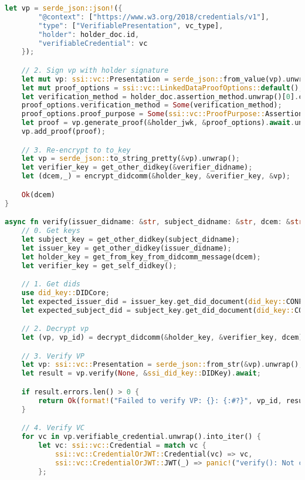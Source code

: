 \begin{lstlisting}[language=Rust]
    let vp = serde_json::json!({
        "@context": ["https://www.w3.org/2018/credentials/v1"],
        "type": ["VerifiablePresentation", vc_type],
        "holder": holder_doc.id,
        "verifiableCredential": vc
    });

    // 2. Sign vp with holder signature
    let mut vp: ssi::vc::Presentation = serde_json::from_value(vp).unwrap();
    let mut proof_options = ssi::vc::LinkedDataProofOptions::default();
    let verification_method = holder_doc.assertion_method.unwrap()[0].clone();
    proof_options.verification_method = Some(verification_method);
    proof_options.proof_purpose = Some(ssi::vc::ProofPurpose::AssertionMethod);
    let proof = vp.generate_proof(&holder_jwk, &proof_options).await.unwrap();
    vp.add_proof(proof);

    // 3. Re-encrypt to to_key
    let vp = serde_json::to_string_pretty(&vp).unwrap();
    let verifier_key = get_other_didkey(&verifier_didname);
    let (dcem,_) = encrypt_didcomm(&holder_key, &verifier_key, &vp);

    Ok(dcem)
}

async fn verify(issuer_didname: &str, subject_didname: &str, dcem: &str) -> Result<String, std::io::Error> {
    // 0. Get keys
    let subject_key = get_other_didkey(subject_didname);
    let issuer_key = get_other_didkey(issuer_didname);
    let holder_key = get_from_key_from_didcomm_message(dcem);
    let verifier_key = get_self_didkey();

    // 1. Get dids
    use did_key::DIDCore;
    let expected_issuer_did = issuer_key.get_did_document(did_key::CONFIG_LD_PUBLIC).id;
    let expected_subject_did = subject_key.get_did_document(did_key::CONFIG_LD_PUBLIC).id;

    // 2. Decrypt vp
    let (vp, vp_id) = decrypt_didcomm(&holder_key, &verifier_key, dcem);

    // 3. Verify VP
    let vp: ssi::vc::Presentation = serde_json::from_str(&vp).unwrap();
    let result = vp.verify(None, &ssi_did_key::DIDKey).await;

    if result.errors.len() > 0 {
        return Ok(format!("Failed to verify VP: {}: {:#?}", vp_id, result))
    }

    // 4. Verify VC
    for vc in vp.verifiable_credential.unwrap().into_iter() {
        let vc: ssi::vc::Credential = match vc {
            ssi::vc::CredentialOrJWT::Credential(vc) => vc,
            ssi::vc::CredentialOrJWT::JWT(_) => panic!("verify(): Not credential. Was JWT")
        };


\end{lstlisting}
